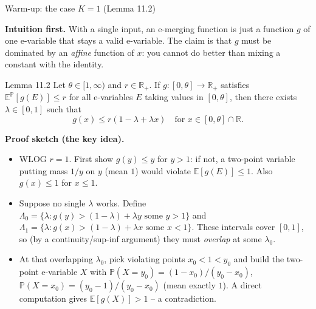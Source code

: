 \documentclass[aspectratio=169,10pt]{beamer}
\newcommand{\PP}{\mathbb{P}}
\newcommand{\EE}{\mathbb{E}}
\newcommand{\RR}{\mathbb{R}}
\newcommand{\1}{\mathbb{1}}
\begin{document}
\begin{frame}[allowframebreaks]{Warm-up: the case $K=1$ (Lemma 11.2)}

\textbf{Intuition first.} With a single input, an e-merging function is just a function $g$ of one e-variable that stays a valid e-variable. The claim is that $g$ must be dominated by an \emph{affine} function of $x$: you cannot do better than mixing a constant with the identity.

\begin{block}{Lemma 11.2}
Let $\theta \in [1,\infty)$ and $r \in \RR_+$. If $g:[0,\theta]\to\RR_+$ satisfies $\EE^\PP[g(E)] \le r$ for all e-variables $E$ taking values in $[0,\theta]$, then there exists $\lambda \in [0,1]$ such that
\[
g(x) \le r(1-\lambda+\lambda x) \quad \text{for } x \in [0,\theta]\cap\RR.
\]
\end{block}

\textbf{Proof sketch (the key idea).}
\begin{itemize}
\item WLOG $r=1$. First show $g(y)\le y$ for $y>1$: if not, a two-point variable putting mass $1/y$ on $y$ (mean $1$) would violate $\EE[g(E)]\le 1$. Also $g(x)\le 1$ for $x\le 1$.
\item Suppose no single $\lambda$ works. Define $\Lambda_0=\{\lambda: g(y)>(1-\lambda)+\lambda y \text{ some } y>1\}$ and $\Lambda_1 = \{\lambda: g(x) > (1-\lambda)+\lambda x \text{ some } x<1\}$. These intervals cover $[0,1]$, so (by a continuity/sup-inf argument) they must \emph{overlap} at some $\lambda_0$.
\item At that overlapping $\lambda_0$, pick violating points $x_0<1<y_0$ and build the two-point e-variable $X$ with $\PP(X=y_0) = (1-x_0)/(y_0-x_0)$, $\PP(X=x_0)=(y_0-1)/(y_0-x_0)$ (mean exactly $1$). A direct computation gives $\EE[g(X)] > 1$ -- a contradiction.
\end{itemize}

\end{frame}
\end{document}
